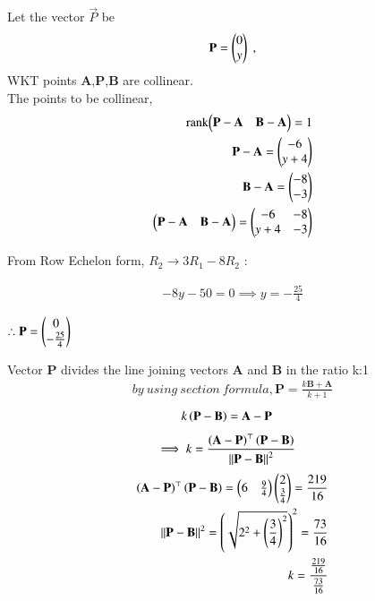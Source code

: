 \documentclass[journal]{IEEEtran}
\begin{document}
Let the vector $\vec{P}$ be 
\begin{align}
    \vec{P}=\begin{myvec}{0\\y}\end{myvec} \;, 
\end{align}
WKT points \textbf{A},\textbf{P},\textbf{B} are collinear.\\
The points to be collinear,
\begin{align}
	\label{eq:line-rank-2}
	\text{rank}{\ensuremath{\begin{pmatrix}\mathbf{P}-\mathbf{A}& \mathbf{B}-\mathbf{A}\end{pmatrix}}} = 1\\
        \mathbf{P}-\mathbf{A} = \begin{pmatrix}-6\\y+4\end{pmatrix}\\
         \mathbf{B}-\mathbf{A} = \begin{pmatrix}-8\\-3\end{pmatrix}\\
        \begin{pmatrix}\mathbf{P}-\mathbf{A}& \mathbf{B}-\mathbf{A}\end{pmatrix} = \begin{pmatrix}-6 & -8\\ y+4&-3 \end{pmatrix}
      \end{align}
 \begin{center}
 From Row Echelon form,
$R_2 \rightarrow 3R_1-8R_2$ :
\\
\end{center}
 \begin{align}
  -8y-50=0\implies y=-\frac{25}{4}
 \end{align}
 \begin{center}
      $\therefore \vec{P}=\begin{myvec}{0\\-\frac{25}{4}}\end{myvec}$
 \end{center}
Vector \textbf{P} divides the line joining vectors \textbf{A} and \textbf{B} in the ratio k:1
\begin{align}
    by\ using \ section\ formula,
    \textbf{P}=\frac{k\textbf{B}+\textbf{A}}{k+1}
\end{align}
 \begin{align}
			k\left(\mathbf{P}-\mathbf{B}\right)&= \mathbf{A}-\mathbf{P}
\end{align}
\begin{align}
    \implies k &=
		\frac{\left(\mathbf{A}-\mathbf{P}\right)^{\top}\left(\mathbf{P}-\mathbf{B}\right)}{\left\lVert\mathbf{P}-\mathbf{B}\right\rVert^2}
			\label{eq:section_formula-k}
\end{align}
\begin{align}
\left(\mathbf{A}-\mathbf{P}\right)^{\top}\left(\mathbf{P}-\mathbf{B}\right) = \begin{pmatrix}6 & \frac{9}{4}\end{pmatrix}\begin{pmatrix}2\\ \frac{3}{4}
\end{pmatrix}=\frac{219}{16}\\
{\left\lVert\mathbf{P}-\mathbf{B}\right\rVert^2} = \left(\sqrt{2^2 + {\left(\frac{3}{4}\right)}^2}\right)^2 = \frac{73}{16}\\
k=\frac{\frac{219}{16}}{\frac{73}{16}}
\end{align}
\end{document}
